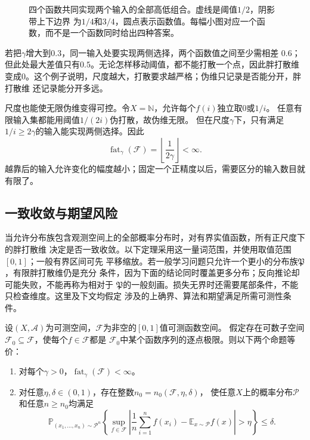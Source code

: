 \begin{figure}[htbp]
 \centering
 
 \caption{四个函数共同实现两个输入的全部高低组合。虚线是阈值$1/2$，阴影带上下边界
 为$1/4$和$3/4$，圆点表示函数值。每幅小图对应一个函数，而不是一个函数同时给出四种答案。}
 \label{fig:fat-shattering-example}
\end{figure}
\FloatBarrier

若把$\gamma$增大到$0.3$，同一输入处要实现两侧选择，两个函数值之间至少需相差
$0.6$；但此处最大差值只有$0.5$。无论怎样移动阈值，都不能打散一个点，因此胖打散维
变成0。这个例子说明，尺度越大，打散要求越严格；伪维只记录是否能分开，胖打散维
还记录能分开多远。

尺度也能使无限伪维变得可控。令$X=\mathbb N$，允许每个$f(i)$独立取0或$1/i$。
任意有限输入集都能用阈值$1/(2i)$伪打散，故伪维无限。
但在尺度$\gamma$下，只有满足$1/i\geq2\gamma$的输入能实现两侧选择。因此
\[
 \operatorname{fat}_{\gamma}(\mathcal F)=\left\lfloor\frac1{2\gamma}\right\rfloor<\infty.
\]
越靠后的输入允许变化的幅度越小；固定一个正精度以后，需要区分的输入数目就有限了。

\subsection{一致收敛与期望风险}

当允许分布族包含观测空间上的全部概率分布时，对有界实值函数，所有正尺度下的胖打散维
决定是否一致收敛。以下定理采用这一量词范围，并使用取值范围$[0,1]$；一般有界区间可先
平移缩放。若一般学习问题只允许一个更小的分布族$\mathfrak P$，有限胖打散维仍是充分
条件，因为下面的结论同时覆盖更多分布；反向推论却可能失败，不能再称为相对于
$\mathfrak P$的一般刻画。损失无界时还需要尾部条件，不能只检查维度。这里及下文均假定
涉及的上确界、算法和期望满足所需可测性条件。

\begin{theorem}[胖打散维与一致收敛]
\label{thm:fat-uniform-convergence}
设$(X,\mathcal A)$为可测空间，$\mathcal F$为非空的$[0,1]$值可测函数空间。
假定存在可数子空间$\mathcal F_0\subseteq\mathcal F$，使每个$f\in\mathcal F$都是
$\mathcal F_0$中某个函数序列的逐点极限。则以下两个命题等价：
\begin{enumerate}
 \item 对每个$\gamma>0$，$\operatorname{fat}_{\gamma}(\mathcal F)<\infty$。
 \item 对任意$\eta,\delta\in(0,1)$，存在整数$n_0=n_0(\mathcal F,\eta,\delta)$，
 使任意$X$上的概率分布$\mathcal P$和任意$n\geq n_0$均满足
 \[
 \mathbb P_{(x_1,\ldots,x_n)\sim\mathcal P^n}\!\left\{
 \sup_{f\in\mathcal F}
 \left|\frac1n\sum_{i=1}^n f(x_i)-\mathbb E_{x\sim\mathcal P}f(x)\right|
 >\eta\right\}\leq\delta.
 \]
\end{enumerate}
\end{theorem}

